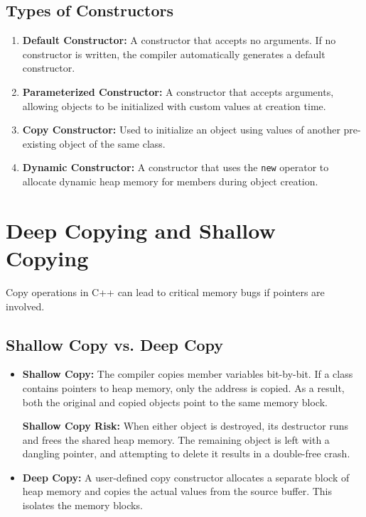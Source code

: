 \documentclass[12pt,a4paper]{article}
\begin{document}
\subsection{Types of Constructors}
\begin{enumerate}[label=\textbf{\arabic*.}, leftmargin=*, itemsep=4pt]
  \item \textbf{Default Constructor:} A constructor that accepts no arguments. If no constructor is written, the compiler automatically generates a default constructor.
  \item \textbf{Parameterized Constructor:} A constructor that accepts arguments, allowing objects to be initialized with custom values at creation time.
  \item \textbf{Copy Constructor:} Used to initialize an object using values of another pre-existing object of the same class.
  \item \textbf{Dynamic Constructor:} A constructor that uses the \texttt{new} operator to allocate dynamic heap memory for members during object creation.
\end{enumerate}

\section{Deep Copying and Shallow Copying}

Copy operations in C++ can lead to critical memory bugs if pointers are involved.

\subsection{Shallow Copy vs. Deep Copy}
\begin{itemize}[leftmargin=*, itemsep=3pt]
  \item \textbf{Shallow Copy:} The compiler copies member variables bit-by-bit. If a class contains pointers to heap memory, only the address is copied. As a result, both the original and copied objects point to the same memory block.
    \begin{tcolorbox}[defbox]
    \textbf{Shallow Copy Risk:} When either object is destroyed, its destructor runs and frees the shared heap memory. The remaining object is left with a dangling pointer, and attempting to delete it results in a double-free crash.
    \end{tcolorbox}
  \item \textbf{Deep Copy:} A user-defined copy constructor allocates a separate block of heap memory and copies the actual values from the source buffer. This isolates the memory blocks.
\end{itemize}
\end{document}
